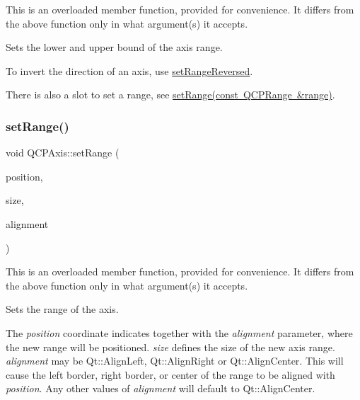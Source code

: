 This is an overloaded member function, provided for convenience. It differs from the above function only in what argument(s) it accepts.

Sets the lower and upper bound of the axis range.

To invert the direction of an axis, use \mbox{\hyperlink{class_q_c_p_axis_a2172fdb196b1a0dc3f40992fcad8e9e1}{set\+Range\+Reversed}}.

There is also a slot to set a range, see \mbox{\hyperlink{class_q_c_p_axis_aebdfea5d44c3a0ad2b4700cd4d25b641}{set\+Range(const Q\+C\+P\+Range \&range)}}. \mbox{\label{class_q_c_p_axis_acf60e5b2d631fbc8c4548c3d579cb6d0}} 
\subsubsection{\texorpdfstring{set\+Range()}{setRange()}\hspace{0.1cm}{\footnotesize\ttfamily [3/3]}}
{\footnotesize\ttfamily void Q\+C\+P\+Axis\+::set\+Range (\begin{DoxyParamCaption}\item[{double}]{position,  }\item[{double}]{size,  }\item[{Qt\+::\+Alignment\+Flag}]{alignment }\end{DoxyParamCaption})}

This is an overloaded member function, provided for convenience. It differs from the above function only in what argument(s) it accepts.

Sets the range of the axis.

The {\itshape position} coordinate indicates together with the {\itshape alignment} parameter, where the new range will be positioned. {\itshape size} defines the size of the new axis range. {\itshape alignment} may be Qt\+::\+Align\+Left, Qt\+::\+Align\+Right or Qt\+::\+Align\+Center. This will cause the left border, right border, or center of the range to be aligned with {\itshape position}. Any other values of {\itshape alignment} will default to Qt\+::\+Align\+Center. \mbox{\label{class_q_c_p_axis_afcf51227d337db28d1a9ce9a4d1bc91a}} 

